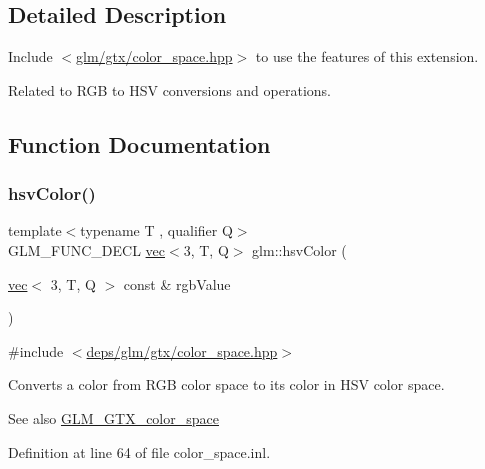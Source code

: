 \subsection{Detailed Description}
Include $<$\hyperlink{gtx_2color__space_8hpp}{glm/gtx/color\+\_\+space.\+hpp}$>$ to use the features of this extension.

Related to R\+GB to H\+SV conversions and operations. 

\subsection{Function Documentation}
\mbox{\label{group__gtx__color__space_ga789802bec2d4fe0f9741c731b4a8a7d8}} 
\subsubsection{\texorpdfstring{hsv\+Color()}{hsvColor()}}
{\footnotesize\ttfamily template$<$typename T , qualifier Q$>$ \\
G\+L\+M\+\_\+\+F\+U\+N\+C\+\_\+\+D\+E\+CL \hyperlink{structglm_1_1vec}{vec}$<$3, T, Q$>$ glm\+::hsv\+Color (\begin{DoxyParamCaption}\item[{\hyperlink{structglm_1_1vec}{vec}$<$ 3, T, Q $>$ const \&}]{rgb\+Value }\end{DoxyParamCaption})}



{\ttfamily \#include $<$\hyperlink{gtx_2color__space_8hpp}{deps/glm/gtx/color\+\_\+space.\+hpp}$>$}

Converts a color from R\+GB color space to its color in H\+SV color space. \begin{DoxySeeAlso}{See also}
\hyperlink{group__gtx__color__space}{G\+L\+M\+\_\+\+G\+T\+X\+\_\+color\+\_\+space} 
\end{DoxySeeAlso}


Definition at line 64 of file color\+\_\+space.\+inl.

\mbox{\label{group__gtx__color__space_gad028e0a4f1a9c812b39439b746295b34}} 
